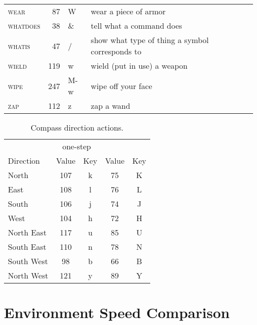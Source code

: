 \documentclass{article}
\begin{document}
\begin{center}
\begin{longtable}{>{\scshape}lr>{\ttfamily}ll}
    wear & 87 & W  & wear a piece of armor\\
    whatdoes & 38 & \&  & tell what a command does\\
    whatis & 47 & /  & show what type of thing a symbol corresponds to\\
    wield & 119 & w  & wield (put in use) a weapon\\
    wipe & 247 & M-w  & wipe off your face\\
    zap & 112 & z  & zap a wand\\
  \bottomrule \end{longtable}\normalsize    \label{table:commandactions}
\end{center}

\begin{table}[h]
\centering
\caption{Compass direction actions.\\[1em]}
\label{table:compassdirections}
\begin{tabular}{lc>{\ttfamily}cc>{\ttfamily}c}
\toprule & \multicolumn{2}{c}{one-step} & \multicolumn{2}{c}{move far}
\\ \cmidrule(l){2-3} \cmidrule(l){4-5} Direction & \textnormal{Value}
& \textnormal{Key} & Value & \textnormal{Key} \tabularnewline \midrule
North & 107 & k & 75 & K \\ East & 108 & l & 76 & L \\ South & 106 & j
& 74 & J \\ West & 104 & h & 72 & H \\ North East & 117 & u & 85 & U
\\ South East & 110 & n & 78 & N \\ South West & 98 & b & 66 & B
\\ North West & 121 & y & 89 & Y \\ \bottomrule
\end{tabular}
\end{table}


\section{Environment Speed Comparison}
\label{sec:envsspeed}
\end{document}

